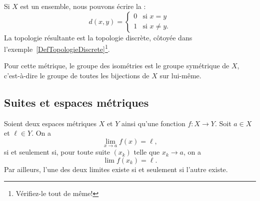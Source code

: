 \begin{example}
    Si \( X\) est un ensemble, nous pouvons écrire la  :
    \begin{equation}
        d(x,y)=\begin{cases}
            0    &   \text{si } x=y\\
            1    &    \text{si } x\neq y\text{.}
        \end{cases}
    \end{equation}
    La topologie résultante est la topologie discrète, côtoyée dans l'exemple~\ref{DefTopologieDiscrete}\footnote{Vérifiez-le tout de même!}.

    Pour cette métrique, le groupe des isométries est le groupe symétrique de \( X\), c'est-à-dire le groupe de toutes les bijections de \( X\) sur lui-même.
\end{example}


\subsection{Suites et espaces métriques}


\begin{proposition}     \label{PROPooJYOOooZWocoq}
    Soient deux espaces métriques \( X\) et \( Y\) ainsi qu'une fonction \( f\colon X\to Y\). Soit \( a\in X\) et \( \ell\in Y\). On a
    \begin{equation}\label{EqLimooJYOOooZWocoqG}
        \lim_{x\to a} f(x)=\ell,
    \end{equation}
    si et seulement si, pour toute suite \( (x_k) \) telle que \( x_k \to a \), on a
    \begin{equation}\label{EqLimooJYOOooZWocoqS}
        \lim f(x_k)=\ell.
    \end{equation}
    Par ailleurs, l'une des deux limites existe si et seulement si l'autre existe.
\end{proposition}

